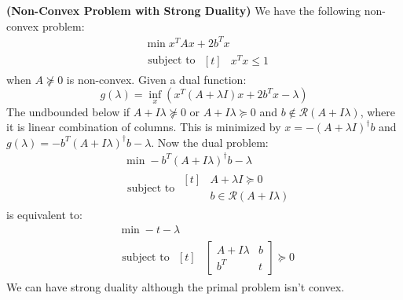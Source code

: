 \begin{remark}{\textbf{(Non-Convex Problem with Strong Duality)}}
    We have the following non-convex problem:
    \begin{equation*}
    \begin{aligned}
        &\min x^TAx + 2b^Tx \\
        &\text{ subject to } \begin{aligned}[t]
            &x^Tx\le1
        \end{aligned}
    \end{aligned}
    \end{equation*}
    when $A\not\succeq0$ is non-convex. Given a dual function:
    \begin{equation*}
        g(\lambda) = \inf_x (x^T(A+\lambda I)x + 2b^Tx - \lambda)
    \end{equation*}
    The undbounded below if $A+I\lambda\not\succeq0$ or $A+I\lambda\succeq0$ and $b\not\in\mathcal{R}(A+I\lambda)$, where it is linear combination of columns. This is minimized by $x=-(A+\lambda I)^\dagger b$ and $g(\lambda)= -b^T(A+I\lambda)^\dagger b-\lambda$. Now the dual problem:
    \begin{equation*}
    \begin{aligned}
        &\min -b^T(A+I\lambda)^\dagger b - \lambda \\
        &\text{ subject to } \begin{aligned}[t]
            &A+\lambda I \succeq 0 \\
            &b\in\mathcal{R}(A+I\lambda)
        \end{aligned}
    \end{aligned}
    \end{equation*}
    is equivalent to:
    \begin{equation*}
    \begin{aligned}
        &\min -t - \lambda \\
        &\text{ subject to } \begin{aligned}[t]
            &\begin{bmatrix}
                A+I\lambda & b \\
                b^T & t
            \end{bmatrix}\succeq 0
        \end{aligned}
    \end{aligned}
    \end{equation*}
    We can have strong duality although the primal problem isn't convex. 
\end{remark}

